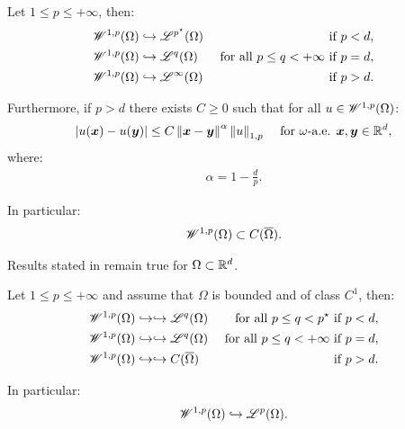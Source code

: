 \begin{corollary}
    Let $1 \leq p \leq +\infty$, then:
    \begin{align}
        \mathscr{W}^{1, p}(\Omega) & \hookrightarrow \mathscr{L}^{p^{\star}}(\Omega) & \text{ if } p < d, \\
        \mathscr{W}^{1, p}(\Omega) & \hookrightarrow \mathscr{L}^{q}(\Omega) &\text{ for all } p \leq q < +\infty \text{ if } p = d, \\
        \mathscr{W}^{1, p}(\Omega) & \hookrightarrow \mathscr{L}^{\infty}(\Omega) & \text{ if } p > d.
    \end{align}

    Furthermore, if $p > d$ there exists $C \geq 0$ such that for all $u \in \mathscr{W}^{1, p}(\Omega)$:
    \begin{align}
        \left\lvert u(\bm{x}) - u(\bm{y}) \right\rvert &\leq C \left\lVert \bm{x} - \bm{y} \right\rVert^{\alpha} \left\lVert u \right\rVert_{1, p} &\text{ for } \omega \text{-a.e. } \bm{x}, \bm{y} \in \mathbb{R}^{d},
    \end{align}
    where:
    \begin{align}
        \alpha = 1 - \frac{d}{p}.
    \end{align}

    In particular:
    \begin{align}
        \mathscr{W}^{1, p}(\Omega) \subset C(\overline{\Omega}).
    \end{align}
\end{corollary}

\begin{corollary}
    Results stated in  remain true for $\Omega \subset \mathbb{R}^{d}$.
\end{corollary}

\begin{theorem}
    Let $1 \leq p \leq +\infty$ and assume that $\Omega$ is bounded and of class $C^1$, then:
    \begin{align}
        \mathscr{W}^{1, p}(\Omega) & \hookrightarrow \hookrightarrow \mathscr{L}^{q}(\Omega) &\text{ for all } p \leq q < p^{\star} \text{ if } p < d, \\
        \mathscr{W}^{1, p}(\Omega) & \hookrightarrow \hookrightarrow \mathscr{L}^{q}(\Omega) &\text{ for all } p \leq q < +\infty \text{ if } p = d, \\
        \mathscr{W}^{1, p}(\Omega) & \hookrightarrow \hookrightarrow C(\overline{\Omega}) & \text{ if } p > d.
    \end{align}

    In particular:
    \begin{align}
        \mathscr{W}^{1, p}(\Omega) \hookrightarrow \mathscr{L}^{p}(\Omega).
    \end{align}
\end{theorem}

